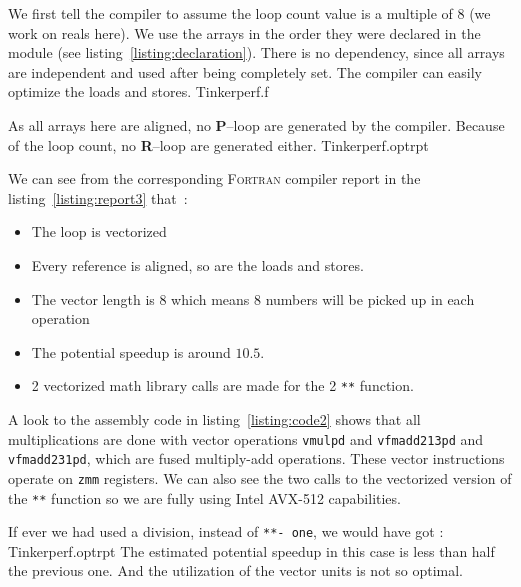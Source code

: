 \documentclass[9pt,comparison]{livecoms}
\newcommand{\lv}{\Large\verb}
\begin{document}
We first tell the compiler to assume the loop count value is a multiple of 8 (we work on reals here). We use the arrays in the order they were declared in the module (see listing~\ref{listing:declaration}). There is no dependency, since all arrays are independent and used after being completely set. The compiler can easily optimize the loads and stores.
 {Tinkerperf.f}

As all arrays here are aligned, no \textbf{P}--loop are generated by the compiler. Because of the loop count, no \textbf{R}--loop are generated either.
 {Tinkerperf.optrpt} 

We can see from the corresponding \textsc{Fortran} compiler report in the listing~\ref{listing:report3} that~:

\begin{itemize}
    \item The loop is vectorized
    \item Every reference is aligned, so are the loads and stores.
    \item The vector length is 8 which means 8 numbers will be picked up in each operation
    \item The potential speedup is around $10.5$.
    \item 2 vectorized math library calls are made for the 2 {\color{blue}\lv|**|} function.
\end{itemize}


A look to the assembly code in listing~\ref{listing:code2} shows that all multiplications are done with vector operations {\color{codegreen}\lv|vmulpd|} and {\color{codegreen}\lv|vfmadd213pd|} and {\color{codegreen}\lv|vfmadd231pd|}, which are fused multiply-add operations. These vector instructions operate on {\color{red}\lv|zmm|} registers. We can also see the two calls to the vectorized version of the {\color{blue}\lv|**|} function so we are fully using Intel AVX-512 capabilities.

If ever we had used a division, instead of {\color{blue}\lv|**|\color{red}\lv|- one|}, we would have got :
 {Tinkerperf.optrpt}
The estimated potential speedup in this case is less than half the previous one. And the utilization of the vector units is not so optimal.
\end{document}
